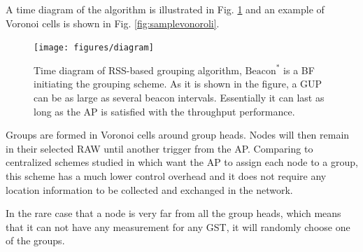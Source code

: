A time diagram of the algorithm is illustrated in Fig. \ref{fig:diagram} and an example of Voronoi cells is shown in Fig. \ref{fig:samplevonoroli}.


\begin{figure} [!tbp]
  \centering
  \texttt{[image: figures/diagram]}
  \caption{Time diagram of RSS-based grouping algorithm, $\text{Beacon}^{\ast}$ is a BF initiating the grouping scheme. As it is shown in the figure, a GUP can be as large as several beacon intervals. Essentially it can last as long as the AP is satisfied with the throughput performance.}
  \label{fig:diagram}
\end{figure}


Groups are formed in Voronoi cells around group heads. Nodes will then remain in their selected RAW until another trigger from the AP.
Comparing to centralized schemes studied in \cite{zheng2014performance} which want the AP to assign each node to a group, this scheme has a much lower control overhead and it does not require any location information to be collected and exchanged in the network.%

In the rare case that a node is very far from all the group heads, which means that it can not have any measurement for any GST, it will randomly choose one of the groups.
 
